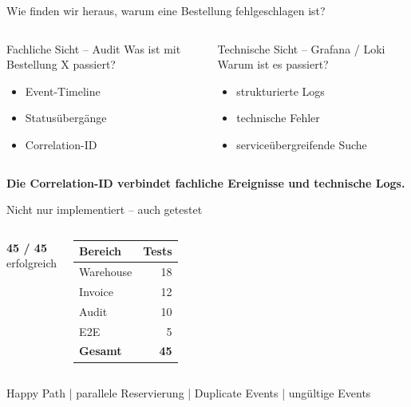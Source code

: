 \documentclass[aspectratio=169,11pt]{beamer}
\newcommand{\storyline}[1]{\vspace{.25cm}\begin{center}\colorbox{hsBlue!8}{\parbox{.92\linewidth}{\centering\small\textbf{#1}}}\end{center}}
\begin{document}
\begin{frame}{Wie finden wir heraus, warum eine Bestellung fehlgeschlagen ist?}
\begin{columns}[T,onlytextwidth]
\begin{block}{Fachliche Sicht – Audit}
\centering
\faList\quad Was ist mit Bestellung X passiert?
\vspace{.25cm}
\begin{itemize}
  \item Event-Timeline
  \item Statusübergänge
  \item Correlation-ID
\end{itemize}
\end{block}
\begin{block}{Technische Sicht – Grafana / Loki}
\centering
\faChartLine\quad Warum ist es passiert?
\vspace{.25cm}
\begin{itemize}
  \item strukturierte Logs
  \item technische Fehler
  \item serviceübergreifende Suche
\end{itemize}
\end{block}
\end{columns}
\storyline{Die Correlation-ID verbindet fachliche Ereignisse und technische Logs.}
\end{frame}

\begin{frame}{Nicht nur implementiert – auch getestet}
\begin{columns}[c,onlytextwidth]
\centering
{\fontsize{34}{38}\selectfont\textcolor{AuditGreen}{\textbf{45 / 45}}}\\[.2cm]
{\Large erfolgreich}
\begin{tabular}{lr}
\toprule
\textbf{Bereich} & \textbf{Tests}\\
\midrule
Warehouse & 18\\
Invoice & 12\\
Audit & 10\\
E2E & 5\\
\midrule
\textbf{Gesamt} & \textbf{45}\\
\bottomrule
\end{tabular}
\end{columns}
\vspace{.45cm}
\centering\small Happy Path \quad | \quad parallele Reservierung \quad | \quad Duplicate Events \quad | \quad ungültige Events
\end{frame}
\end{document}
